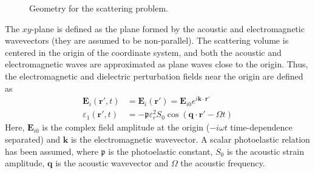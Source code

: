 \documentclass[10pt,a4paper,draft]{scrartcl}
\begin{document}
\begin{figure}[h]
		\caption{\label{fig:radareq-geom} Geometry for the scattering problem.}
	\end{figure}
	The $xy$-plane is defined as the plane formed by the acoustic and electromagnetic wavevectors (they are assumed to be non-parallel). The scattering volume is centered in the origin of the coordinate system, and both the acoustic and electromagnetic waves are approximated as plane waves close to the origin. Thus, the electromagnetic and dielectric perturbation fields near the origin are defined as
	\begin{align*}
		\bm{E}_i (\bm{r}',t) &= \bm{E}_i (\bm{r}') = \bm{E}_{i0} e^{i\bm{k}\cdot\bm{r}'} \\
		\varepsilon_1 (\bm{r}',t) &= -\mathfrak{p} \varepsilon_r^2 S_0 \cos(\bm{q} \cdot \bm{r}' - \Omega t)
	\end{align*}
	Here, $\bm{E}_{i0}$ is the complex field amplitude at the origin ($-i\omega t$ time-dependence separated) and $\bm{k}$ is the electromagnetic wavevector. A scalar photoelastic relation has been assumed, where $\mathfrak{p}$ is the photoelastic constant, $S_0$ is the acoustic strain amplitude, $\bm{q}$ is the acoustic wavevector and $\Omega$ the acoustic frequency.
	
\end{document}
